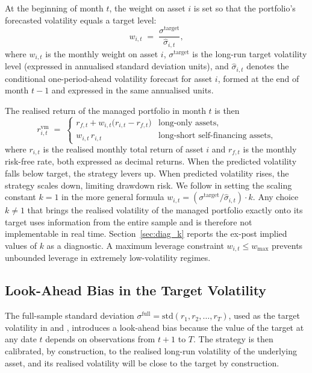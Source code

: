 \documentclass[12pt, a4paper]{article}
\newcommand{\stgt}{\sigma^{\mathrm{target}}}
\newcommand{\shat}{\hat{\sigma}}
\begin{document}
At the beginning of month $t$, the weight on asset $i$ is set so that the portfolio's
forecasted volatility equals a target level:
\begin{equation}
  w_{i,t} \;=\; \frac{\stgt}{\shat_{i,t}},
  \label{eq:weight}
\end{equation}
where $w_{i,t}$ is the monthly weight on asset $i$, $\stgt$ is the long-run target
volatility level (expressed in annualised standard deviation units), and $\shat_{i,t}$
denotes the conditional one-period-ahead volatility forecast for asset $i$, formed at the
end of month $t-1$ and expressed in the same annualised units.

The realised return of the managed portfolio in month $t$ is then
\begin{equation}
  r_{i,t}^{\mathrm{vm}} \;=\;
  \begin{cases}
    r_{f,t} + w_{i,t}\bigl(r_{i,t} - r_{f,t}\bigr) & \text{long-only assets,}\\
    w_{i,t}\, r_{i,t} & \text{long-short self-financing assets,}
  \end{cases}
  \label{eq:returns}
\end{equation}
where $r_{i,t}$ is the realised monthly total return of asset $i$ and $r_{f,t}$ is the
monthly risk-free rate, both expressed as decimal returns. When the predicted volatility
falls below target, the strategy levers up. When predicted volatility rises, the strategy
scales down, limiting drawdown risk. We follow \citet{Bongaerts2020} in setting the
scaling constant $k = 1$ in the more general formula $w_{i,t} = (\stgt/\shat_{i,t})\cdot k$.
Any choice $k\neq 1$ that brings the realised volatility of the managed portfolio exactly
onto its target uses information from the entire sample and is therefore not
implementable in real time. Section~\ref{sec:diag_k} reports the ex-post implied values of
$k$ as a diagnostic. A maximum leverage constraint $w_{i,t} \leq w_{\max}$ prevents
unbounded leverage in extremely low-volatility regimes.

\subsection{Look-Ahead Bias in the Target Volatility}
\label{sec:lookahead}

The full-sample standard deviation
$\sigma^{\mathrm{full}} = \mathrm{std}(r_1, r_2, \ldots, r_T)$,
used as the target volatility in \citet{Moreira2017} and \citet{Harvey2018}, introduces a
look-ahead bias because the value of the target at any date $t$ depends on observations
from $t+1$ to $T$. The strategy is then calibrated, by construction, to the realised
long-run volatility of the underlying asset, and its realised volatility will be close to
the target by construction.
\end{document}
